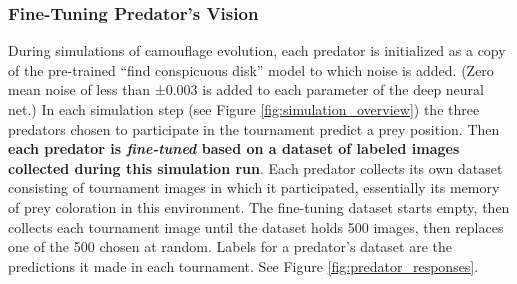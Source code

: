 \documentclass[letterpaper]{article}
\newcommand{\jargon}[1]{\textit{#1}}
\begin{document}
\subsubsection{Fine-Tuning Predator's Vision}
During simulations of camouflage evolution, each predator is initialized as a copy of the pre-trained “find conspicuous disk” model to which noise is added. (Zero mean noise of less than ±0.003 is added to each parameter of the deep neural net.) In each simulation step (see Figure \ref{fig:simulation_overview}) the three predators chosen to participate in the tournament predict a prey position. Then \textbf{each predator is \jargon{fine-tuned} based on a dataset of labeled images collected during this simulation run}. 
Each predator collects its own dataset consisting of tournament images in which it participated, essentially its memory of prey coloration in this environment. The fine-tuning dataset starts empty, then collects each tournament image until the dataset holds 500 images, then replaces one of the 500 chosen at random. Labels for a predator's dataset are the predictions it made in each tournament. See Figure \ref{fig:predator_responses}.
\par

\end{document}
